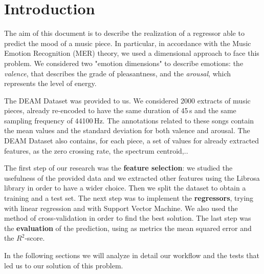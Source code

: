 \section{Introduction}

The aim of this document is to describe the realization of a regressor able to predict the mood of a music piece. In particular, in accordance with the Music Emotion Recognition (MER) theory, we used a dimensional approach to face this problem. We considered two "emotion dimensions" to describe emotions: the \emph{valence}, that describes the grade of pleasantness, and the \emph{arousal}, which represents the level of energy.

The DEAM Dataset was provided to us. We considered 2000 extracts of music pieces, already re-encoded to have the same duration of 45\,s and the same sampling frequency of 44100\,Hz. The annotations related to these songs contain the mean values and the standard deviation for both valence and arousal. The DEAM Dataset also contains, for each piece, a set of values for already extracted features, as the zero crossing rate, the spectrum centroid,..

The first step of our research was the \textbf{feature selection}: we studied the usefulness of the provided data and we extracted other features using the Librosa library in order to have a wider choice. Then we split the dataset to obtain a training and a test set. The next step was to implement the \textbf{regressors}, trying with linear regression and with Support Vector Machine. We also used the method of cross-validation in order to find the best solution. The last step was the \textbf{evaluation} of the prediction, using as metrics the mean squared error and the $R^2$-score.

In the following sections we will analyze in detail our workflow and the tests that led us to our solution of this problem.


